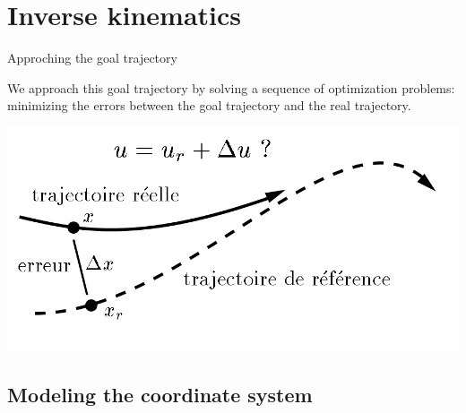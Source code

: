 \documentclass{beamer}
\begin{document}
%
%
\section{Inverse kinematics}


\begin{frame}{Approching the goal trajectory}

	We approach this goal trajectory by solving a sequence of optimization problems: minimizing the errors between the goal trajectory and the real trajectory.
	\medskip

	\includegraphics[scale = 0.4]{tracking.jpg}\cite{2}
\end{frame}

\subsection{Modeling the coordinate system}
\end{document}
